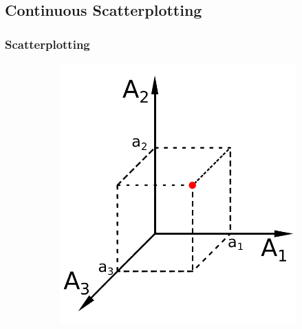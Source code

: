 \documentclass[a4paper,fontsize=12pt,toc=bib,halfparskip,ngerman]{scrartcl}
\begin{document}
\subsection{Continuous Scatterplotting}
\subsubsection{Scatterplotting}
\begin{figure}
	\hspace{2cm}
	\begin{subfigure}{0.30\textwidth}
		\includegraphics[width=\textwidth]{pictures/Scatterplot3D}
		\caption{}
	\end{subfigure}
	\hfill
	\begin{subfigure}{0.30\textwidth}

\end{subfigure}
\end{figure}
\end{document}
